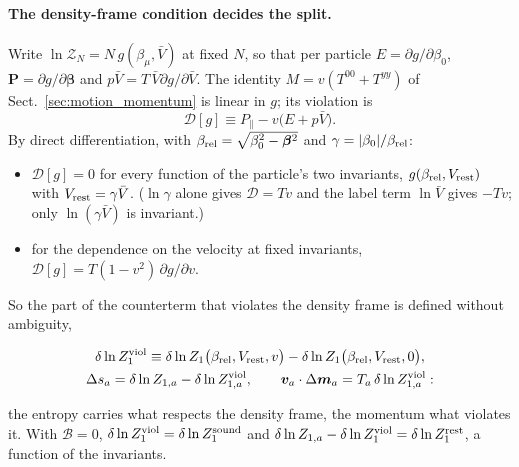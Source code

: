 \documentclass[11pt,aps,preprint,nofootinbib,superscriptaddress,tightenlines]{revtex4-2}
\newcommand{\klab}{\mathcal B}
\def\st{\begin{equation}}
\def\stp{\end{equation}}
\def\Sect#1{Sect.~\ref{#1}}
\let\oldparagraph\paragraph
\renewcommand{\paragraph}{\par\bigskip\oldparagraph}
\begin{document}
\paragraph{The density-frame condition decides the split.}  Write $\ln\mathcal Z_N=N\,g(\beta_\mu,\bar V)$ at fixed $N$, so that per particle $E=\partial g/\partial\beta_0$,
$\bm P=\partial g/\partial\bm\beta$ and $p\bar V=T\,\bar V\partial g/\partial\bar V$.  The identity $M=v(T^{00}+T^{yy})$ of \Sect{sec:motion_momentum} is linear in $g$; its violation is
\st
\mathcal D[g]\equiv P_\parallel-v\big(E+p\bar V\big) .
\stp
By direct differentiation, with $\beta_{\rm rel}=\sqrt{\beta_0^2-\bm\beta^2}$ and $\gamma=|\beta_0|/\beta_{\rm rel}$:
\begin{itemize}
\item $\mathcal D[g]=0$ for every function of the particle's two invariants, $g(\beta_{\rm rel},V_{\rm rest})$ with $V_{\rm rest}=\gamma\bar V$.  ($\ln\gamma$ alone gives $\mathcal D=Tv$ and
  the label term $\ln\bar V$ gives $-Tv$; only $\ln(\gamma\bar V)$ is invariant.)
\item for the dependence on the velocity at fixed invariants, $\mathcal D[g]=T(1-v^2)\,\partial g/\partial v$.
\end{itemize}
So the part of the counterterm that violates the density frame is defined without ambiguity,
\begin{keyeq}
\st
\begin{gathered}
\delta\ln Z_1^{\rm viol}\equiv \delta\ln Z_1\big(\beta_{\rm rel},V_{\rm rest},v\big)-\delta\ln Z_1\big(\beta_{\rm rel},V_{\rm rest},0\big),\\
\Delta s_a=\delta\ln Z_{1,a}-\delta\ln Z^{\rm viol}_{1,a},\qquad \bm v_a\cdot\Delta\bm m_a=T_a\,\delta\ln Z^{\rm viol}_{1,a} :
\end{gathered}
\label{Cviol}
\stp
\end{keyeq}
the entropy carries what respects the density frame, the momentum what violates it.  With $\klab=0$, $\delta\ln Z_1^{\rm viol}=\delta\ln Z_1^{\rm sound}$ and $\delta\ln Z_{1,a}-\delta\ln Z_1^{\rm viol}=\delta\ln Z_1^{\rm rest}$, a function of the
invariants.
\end{document}
